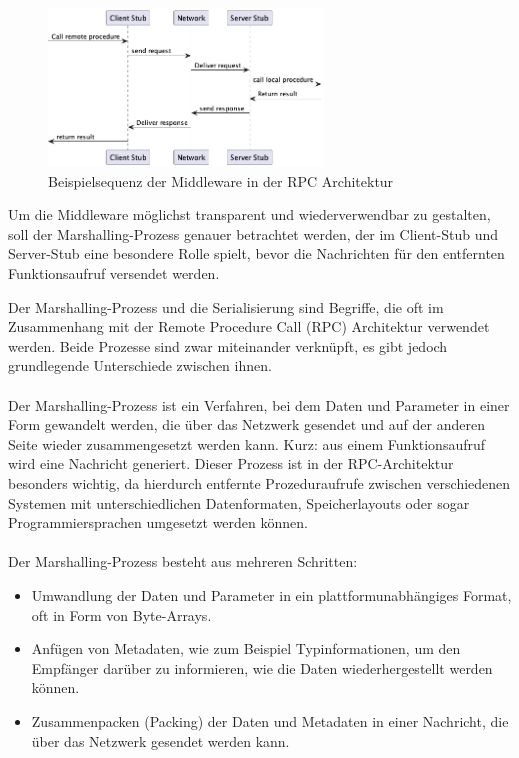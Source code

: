  \begin{figure}[!ht]
  \centering
  \includegraphics[width=0.65\textwidth]{fig/uml/rpc-middleware-seq.png}
  \caption{Beispielsequenz der Middleware in der RPC Architektur}
  \label{fig:rpc-middleware-seq-rpc}
\end{figure}

Um die Middleware möglichst transparent und wiederverwendbar zu gestalten, soll der Marshalling-Prozess genauer betrachtet werden, der im Client-Stub und Server-Stub eine besondere Rolle spielt, bevor die Nachrichten für den entfernten Funktionsaufruf versendet werden. 

Der Marshalling-Prozess und die Serialisierung sind Begriffe, die oft im Zusammenhang mit der Remote Procedure Call (RPC) Architektur verwendet werden. Beide Prozesse sind zwar miteinander verknüpft, es gibt jedoch grundlegende Unterschiede zwischen ihnen.
\\\\
Der Marshalling-Prozess ist ein Verfahren, bei dem Daten und Parameter in einer Form gewandelt werden, die über das Netzwerk gesendet und auf der anderen Seite wieder zusammengesetzt werden kann. Kurz: aus einem Funktionsaufruf wird eine Nachricht generiert. Dieser Prozess ist in der RPC-Architektur besonders wichtig, da hierdurch entfernte Prozeduraufrufe zwischen verschiedenen Systemen mit unterschiedlichen Datenformaten, Speicherlayouts oder sogar Programmiersprachen umgesetzt werden können.
\\\\
Der Marshalling-Prozess besteht aus mehreren Schritten:
\begin{itemize} 
\item Umwandlung der Daten und Parameter in ein plattformunabhängiges Format, oft in Form von Byte-Arrays.
\item Anfügen von Metadaten, wie zum Beispiel Typinformationen, um den Empfänger darüber zu informieren, wie die Daten wiederhergestellt werden können.
\item Zusammenpacken (Packing) der Daten und Metadaten in einer Nachricht, die über das Netzwerk gesendet werden kann.
\end{itemize} 

